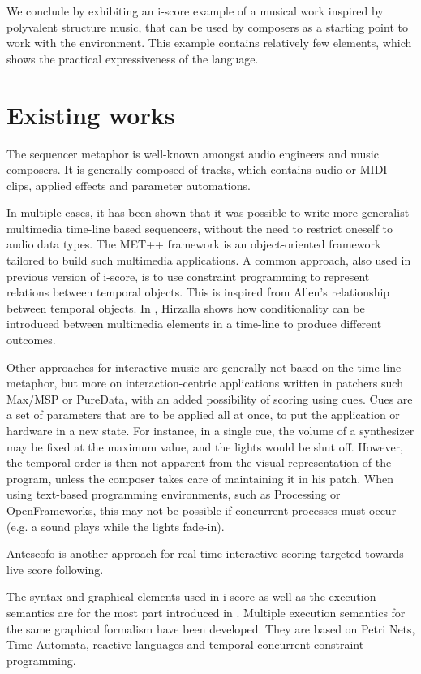 \documentclass{article}
\begin{document}
We conclude by exhibiting an i-score example of a musical work inspired by polyvalent structure music,
that can be used by composers as a starting point to work with the environment. 
This example contains relatively few elements, which shows the practical expressiveness of the language.

\section{Existing works}
The sequencer metaphor is well-known amongst audio engineers and music composers. 
It is generally composed of tracks, which contains audio or MIDI clips, applied effects 
and parameter automations.

In multiple cases, it has been shown that it was possible to write 
more generalist multimedia time-line based sequencers, without the need to restrict oneself 
to audio data types. 
The MET++ framework\cite{ackermann1994direct} is an object-oriented framework 
tailored to build such multimedia applications.
A common approach, also used in previous version of i-score, is to use constraint programming 
to represent relations between temporal objects\cite{song1999interactive, allombert2006concurrent, toro2010concurrent}. 
This is inspired from Allen's relationship between temporal objects.
In \cite{hirzalla1995temporal}, Hirzalla shows how conditionality can be introduced between multimedia elements in a time-line to produce different outcomes.

Other approaches for interactive music are generally not based on the time-line metaphor, 
but more on interaction-centric applications written in patchers such Max/MSP or PureData, 
with an added possibility of scoring using cues. 
Cues are a set of parameters that are to be applied all at once, to put the application or hardware in a new state.
For instance, in a single cue, the volume of a synthesizer may be fixed at the maximum value, and the lights would be shut off.
However, the temporal order is then not apparent from the visual representation of the program, 
unless the composer takes care of maintaining it in his patch.
When using text-based programming environments, such as Processing or OpenFrameworks, this may not be possible if concurrent processes must occur (e.g. a sound plays while the lights fade-in).

Antescofo\cite{cont2008antescofo} is another approach for real-time interactive scoring targeted towards live score following.

The syntax and graphical elements used in i-score as well as the 
execution semantics are for the most part introduced in \cite{celerier2015ossia, baltazar2014score}.
Multiple execution semantics for the same graphical formalism have been developed. 
They are based on Petri Nets\cite{allombert2007system}, Time Automata\cite{arias2015exploiting}, reactive languages\cite{arias2014executing} and temporal concurrent constraint programming\cite{toro2010model}.
\end{document}
